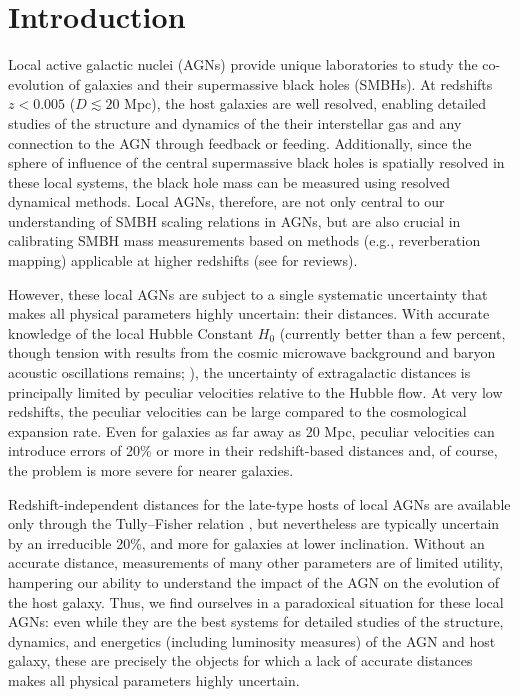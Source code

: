 \documentclass[twocolumn]{aastex63}
\begin{document}
\section{Introduction}

Local active galactic nuclei (AGNs) provide unique laboratories to study the co-evolution of galaxies and their supermassive black holes (SMBHs).  At redshifts $z\!<\!0.005$ ($D\!\lesssim\!20$ Mpc), the host galaxies are well resolved, enabling detailed studies of the structure and dynamics of the their interstellar gas and any connection to the AGN through feedback or feeding. Additionally, since the sphere of influence of the central supermassive black holes is spatially resolved in these local systems, the black hole mass can be measured using resolved dynamical methods. Local AGNs, therefore, are not only central to our understanding of SMBH scaling relations in AGNs, but are also crucial in calibrating SMBH mass measurements based on methods (e.g., reverberation mapping) applicable at higher redshifts (see \citealt{Ferrarese2005,McConnell2013,Sahu2019,Zubovas2019} for reviews).

However, these local AGNs are subject to a single systematic uncertainty that makes all physical parameters highly uncertain: their distances. With accurate knowledge of the local Hubble Constant $H_0$ (currently better than a few
percent, though tension with results from the cosmic microwave background  and baryon acoustic oscillations remains; \citealt{Riess2019}), the uncertainty of extragalactic distances is principally limited by peculiar velocities relative to the Hubble flow.   At very low redshifts, the peculiar velocities can be large compared to the cosmological expansion rate.  Even for galaxies as far away as 20 Mpc, peculiar velocities can introduce errors of 20\% or more in their redshift-based distances and, of course, the problem is more severe for nearer galaxies.

Redshift-independent distances for the late-type hosts of local AGNs are available only  through the Tully--Fisher relation \citep{Tully1977}, but nevertheless are typically uncertain by an irreducible 20\%, and more for galaxies at lower inclination. Without an accurate distance, measurements of many other parameters are of limited utility, hampering our ability to understand the impact of the AGN on the evolution of the host galaxy.  Thus, we find ourselves in a paradoxical situation for these local AGNs:  even while they are the best systems for detailed studies of the structure, dynamics, and energetics (including luminosity measures) of the AGN and host galaxy, these are precisely the objects for which a lack of accurate distances makes all physical parameters highly uncertain. 
\end{document}

